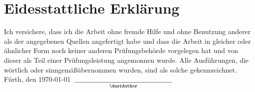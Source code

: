 


\section*{Eidesstattliche Erklärung}


Ich versichere, dass ich die Arbeit ohne fremde Hilfe und ohne Benutzung anderer als der angegebenen Quellen angefertigt habe und dass die Arbeit in gleicher oder \"ahnlicher Form noch keiner anderen Pr\"ufungsbeh\"orde vorgelegen hat und von dieser als Teil einer Pr\"ufungsleistung angemonnen wurde.
Alle Ausf\"uhrungen, die w\"ortlich oder sinngem\"a\ss\;\"ubernommen wurden, sind als solche gekennzeichnet.
\\[4cm]


\noindent
Fürth, den \today~$\underset{\text{\dustAuthor}}{\underline{\hspace{5cm}}}$
